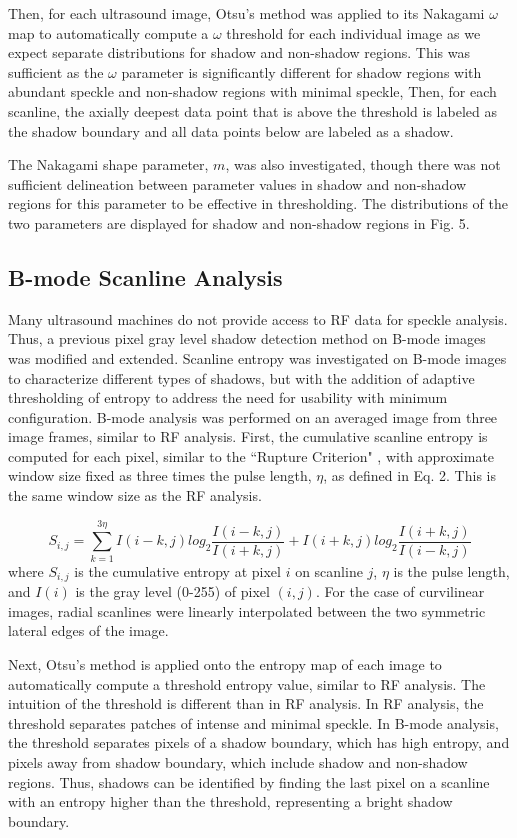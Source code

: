\documentclass[authoryear,preprint,review,12pt]{elsarticle}
\begin{document}
Then, for each ultrasound image, Otsu’s method was applied to its Nakagami $\omega$ map to automatically compute a $\omega$ threshold for each individual image as we expect separate distributions for shadow and non-shadow regions. This was sufficient as the $\omega$ parameter is significantly different for shadow regions with abundant speckle and non-shadow regions with minimal speckle, Then, for each scanline, the axially deepest data point that is above the threshold is labeled as the shadow boundary and all data points below are labeled as a shadow.

The Nakagami shape parameter, $m$, was also investigated, though there was not sufficient delineation between parameter values in shadow and non-shadow regions for this parameter to be effective in thresholding. The distributions of the two parameters are displayed for shadow and non-shadow regions in Fig. 5.
\subsection*{B-mode Scanline Analysis}

Many ultrasound machines do not provide access to RF data for speckle analysis. Thus, a previous pixel gray level shadow detection method on B-mode images was modified and extended. Scanline entropy was investigated on B-mode images to characterize different types of shadows, but with the addition of adaptive thresholding of entropy to address the need for usability with minimum configuration. B-mode analysis was performed on  an averaged image from three image frames, similar to RF analysis. First, the cumulative scanline entropy is computed for each pixel, similar to the ``Rupture Criterion" \citep{Hellier2010}, with approximate window size fixed as three times the pulse length, $\eta$, as defined in Eq. 2. This is the same window size as the RF analysis.

\begin{equation}
S_{i,j} = \sum_{k=1}^{3\eta}I(i-k,j)log_{2}\frac{I(i-k,j)}{I(i+k,j)}+I(i+k,j)log_{2}\frac{I(i+k,j)}{I(i-k,j)}
\end{equation} where $S_{i,j}$ is the cumulative entropy at pixel $i$ on scanline $j$, $\eta$ is the pulse length, and $I(i)$ is the gray level (0-255) of pixel $(i,j)$. For the case of curvilinear images, radial scanlines were linearly interpolated between the two symmetric lateral edges of the image.

Next, Otsu's method is applied onto the entropy map of each image to automatically compute a threshold entropy value, similar to RF analysis. The intuition of the threshold is different than in RF analysis. In RF analysis, the threshold separates patches of intense and minimal speckle. In B-mode analysis, the threshold separates pixels of a shadow boundary, which has high entropy, and pixels away from shadow boundary, which include shadow and non-shadow regions. Thus, shadows can be identified by finding the last pixel on a scanline with an entropy higher than the threshold, representing a bright shadow boundary.
\end{document}
